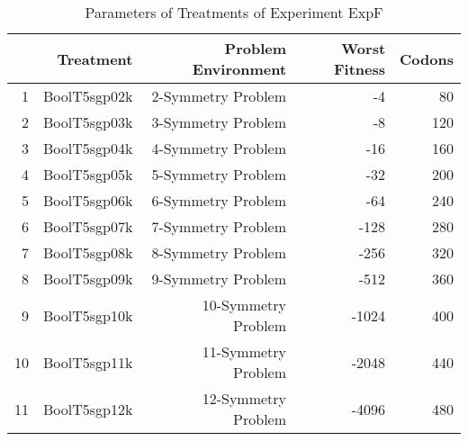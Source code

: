 \begin{table}[ht]
\centering
\begin{tabular}{rrrrr}
  \hline
 & Treatment & Problem Environment & Worst Fitness & Codons \\ 
  \hline
1 & BoolT5sgp02k & 2-Symmetry Problem &    -4 &  80 \\ 
  2 & BoolT5sgp03k & 3-Symmetry Problem &    -8 & 120 \\ 
  3 & BoolT5sgp04k & 4-Symmetry Problem &   -16 & 160 \\ 
  4 & BoolT5sgp05k & 5-Symmetry Problem &   -32 & 200 \\ 
  5 & BoolT5sgp06k & 6-Symmetry Problem &   -64 & 240 \\ 
  6 & BoolT5sgp07k & 7-Symmetry Problem &  -128 & 280 \\ 
  7 & BoolT5sgp08k & 8-Symmetry Problem &  -256 & 320 \\ 
  8 & BoolT5sgp09k & 9-Symmetry Problem &  -512 & 360 \\ 
  9 & BoolT5sgp10k & 10-Symmetry Problem & -1024 & 400 \\ 
  10 & BoolT5sgp11k & 11-Symmetry Problem & -2048 & 440 \\ 
  11 & BoolT5sgp12k & 12-Symmetry Problem & -4096 & 480 \\ 
   \hline
\end{tabular}
\caption{Parameters of Treatments of Experiment ExpF} 
\end{table}
